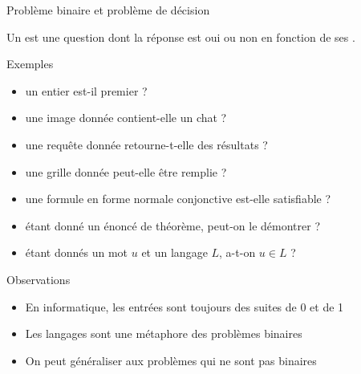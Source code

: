 
\begingroup

\begin{frame}{Problème binaire et problème de décision}
  
  Un  est une question dont la réponse est \alert{oui} ou \alert{non} en fonction de ses .
  
  \begin{exampleblock}{Exemples}
    \vspace{-2mm}
    \begin{itemize}
    \item {} un entier est-il premier ?  
    \item {} une image donnée contient-elle un chat ? 
    \item {} une requête donnée retourne-t-elle des résultats ?  
    \item {} une grille donnée peut-elle être remplie ? 
    \item {} une formule en forme normale conjonctive est-elle satisfiable ? 
    \item {} étant donné un énoncé de théorème, peut-on le démontrer ? 
    \item {} étant donnés un mot $u$ et un langage $L$, a-t-on $u\in L$ ? 
    \end{itemize}
  \end{exampleblock}
  \pause
  \begin{alertblock}{Observations}
    \vspace{-2mm}
    \begin{itemize}
    \item En informatique, les entrées sont toujours des suites de 0 et de 1
    \item \alert{Les langages sont une métaphore des problèmes binaires}
    \item On peut généraliser aux problèmes qui ne sont pas binaires
    \end{itemize}
  \end{alertblock}
  
\end{frame}

\endgroup
\endinput
